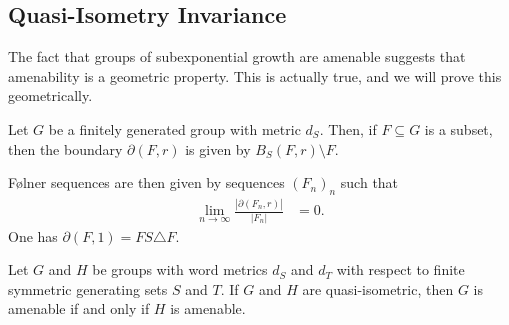 \documentclass[10pt]{mypackage}
\begin{document}
\subsection{Quasi-Isometry Invariance}%
The fact that groups of subexponential growth are amenable suggests that amenability is a geometric property. This is actually true, and we will prove this geometrically.
\begin{definition}
  Let $G$ be a finitely generated group with metric $d_S$. Then, if $F\subseteq G$ is a subset, then the boundary $\partial\left( F,r \right)$ is given by $B_S\left( F,r \right)\setminus F$.

  Følner sequences are then given by sequences $\left( F_n \right)_n$ such that
  \begin{align*}
    \lim_{n\to\infty} \frac{\left\vert \partial\left( F_n,r \right) \right\vert}{\left\vert F_n \right\vert} &= 0.
  \end{align*}
  One has $\partial\left( F,1 \right) = FS\triangle F$.
\end{definition}
\begin{theorem}
  Let $G$ and $H$ be groups with word metrics $d_S$ and $d_T$ with respect to finite symmetric generating sets $S$ and $T$. If $G$ and $H$ are quasi-isometric, then $G$ is amenable if and only if $H$ is amenable.
\end{theorem}
\end{document}
